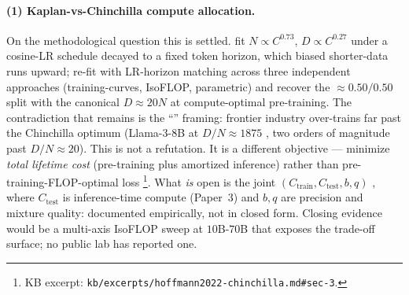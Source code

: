 \paragraph{(1) Kaplan-vs-Chinchilla compute allocation.}
On the methodological question this is settled.
\citet[\S 6]{kaplan2020} fit $N \propto C^{0.73}$, $D \propto C^{0.27}$
under a cosine-LR schedule decayed to a fixed token horizon, which
biased shorter-data runs upward;
\citet[\S 3, Table 2]{hoffmann2022-chinchilla} re-fit with
LR-horizon matching across three independent approaches
(training-curves, IsoFLOP, parametric) and recover the
$\approx 0.50/0.50$ split with the canonical $D \approx 20 N$ at
compute-optimal pre-training. The contradiction that remains is the
``'' framing: frontier industry over-trains far past
the Chinchilla optimum (Llama-3-8B at $D / N \approx 1875$
\citep{meta-llama3}, two orders of magnitude past
$D / N \approx 20$). This is not a refutation. It is a different
objective --- minimize \emph{total lifetime cost} (pre-training plus
amortized inference) rather than pre-training-FLOP-optimal loss
\citep[\S \ref{sec:scaling-map}]{hoffmann2022-chinchilla}\protect\footnote{KB
excerpt: \nolinkurl{kb/excerpts/hoffmann2022-chinchilla.md#sec-3}.}. What
\emph{is} open is the joint
$(C_{\text{train}}, C_{\text{test}}, b, q)$ , where
$C_{\text{test}}$ is inference-time compute (Paper~3) and $b, q$ are
precision and mixture quality: documented empirically, not in closed
form. Closing evidence would be a multi-axis IsoFLOP sweep at
$10$B-$70$B that exposes the trade-off surface; no public lab has
reported one.

